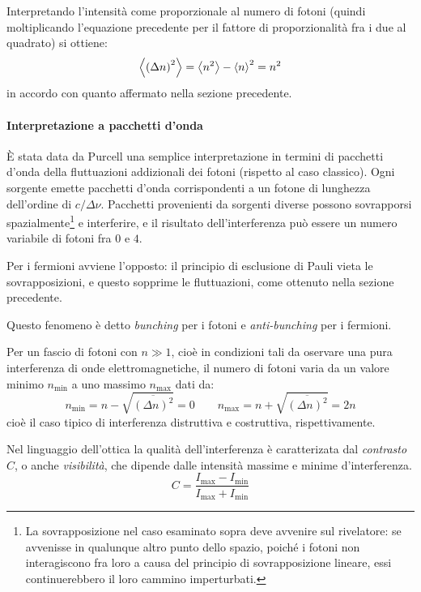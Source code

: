 Interpretando l'intensità come proporzionale al numero di fotoni (quindi moltiplicando l'equazione precedente per il fattore di proporzionalità fra i due al quadrato) si ottiene:
\[ \expval{\left(\Delta n\right)^2} = \expval{n^2} - \expval{n}^2 = n^2 \]
in accordo con quanto affermato nella sezione precedente.

\paragraph{Interpretazione a pacchetti d'onda} \`E stata data da Purcell una semplice interpretazione in termini di pacchetti d'onda della fluttuazioni addizionali dei fotoni (rispetto al caso classico). Ogni sorgente emette pacchetti d'onda corrispondenti a un fotone di lunghezza dell'ordine di $ c/\Delta\nu $. Pacchetti provenienti da sorgenti diverse possono sovrapporsi spazialmente\footnote{La sovrapposizione nel caso esaminato sopra deve avvenire sul rivelatore: se avvenisse in qualunque altro punto dello spazio, poiché i fotoni non interagiscono fra loro a causa del principio di sovrapposizione lineare, essi continuerebbero il loro cammino imperturbati.} e interferire, e il risultato dell'interferenza può essere un numero variabile di fotoni fra $ 0 $ e $ 4 $.

Per i fermioni avviene l'opposto: il principio di esclusione di Pauli vieta le sovrapposizioni, e questo sopprime le fluttuazioni, come ottenuto nella sezione precedente.

Questo fenomeno è detto \textit{bunching} per i fotoni e \textit{anti-bunching} per i fermioni.
\newline

Per un fascio di fotoni con $ n \gg 1 $, cioè in condizioni tali da oservare una pura interferenza di onde elettromagnetiche, il numero di fotoni varia da un valore minimo $ n_{\min} $ a uno massimo $ n_{\max} $ dati da:
\[ n_{\min} = n - \sqrt{\overline{(\Delta n)^2}} = 0 \qquad n_{\max} = n + \sqrt{\overline{(\Delta n)^2}} = 2n\]
cioè il caso tipico di interferenza distruttiva e costruttiva, rispettivamente.

\begin{defn}[Contrasto]
	Nel linguaggio dell'ottica la qualità dell'interferenza è caratterizata dal \textit{contrasto} $ C $, o anche \textit{visibilità}, che dipende dalle intensità massime e minime d'interferenza.
	\begin{equation*}
	C = \frac{I_{\max} - I_{\min}}{I_{\max} + I_{\min}}
	\end{equation*}
\end{defn}

